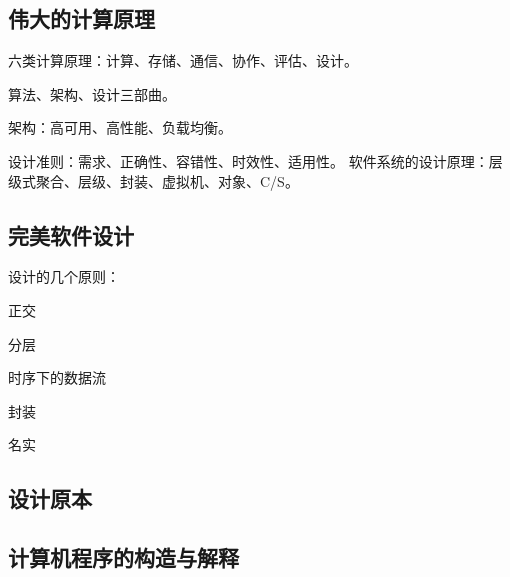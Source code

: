 \subsection{伟大的计算原理}

六类计算原理：计算、存储、通信、协作、评估、设计。

算法、架构、设计三部曲。

架构：高可用、高性能、负载均衡。

设计准则：需求、正确性、容错性、时效性、适用性。
软件系统的设计原理：层级式聚合、层级、封装、虚拟机、对象、C/S。

\subsection{完美软件设计}

设计的几个原则：
\begin{enumbox}
\item 正交
\item 分层
\item 时序下的数据流
\item 封装
\item 名实
\end{enumbox}

\subsection{设计原本}

\subsection{计算机程序的构造与解释}
